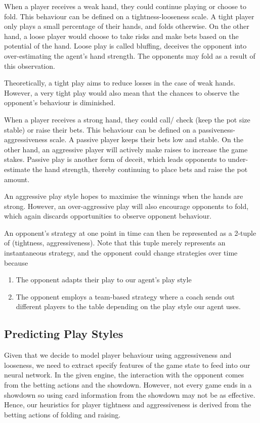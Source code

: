 \documentclass{article}
\begin{document}
When a player receives a weak hand, they could continue playing or choose to fold. This behaviour can be defined on a tightness-looseness scale. A tight player only plays a small percentage of their hands, and folds otherwise. On the other hand, a loose player would choose to take risks and make bets based on the potential of the hand. Loose play is called bluffing, deceives the opponent into over-estimating the agent's hand strength. The opponents may fold as a result of this observation.

Theoretically, a tight play aims to reduce losses in the case of weak hands. However, a very tight play would also mean that the chances to observe the opponent's behaviour is diminished.

When a player receives a strong hand, they could call/ check (keep the pot size stable) or raise their bets. This behaviour can be defined on a passiveness-aggressiveness scale. A passive player keeps their bets low and stable. On the other hand, an aggressive player will actively make raises to increase the game stakes. Passive play is another form of deceit, which leads opponents to under-estimate the hand strength, thereby continuing to place bets and raise the pot amount.

An aggressive play style hopes to maximise the winnings when the hands are strong. However, an over-aggressive play will also encourage opponents to fold, which again discards opportunities to observe opponent behaviour.

An opponent's strategy at one point in time can then be represented as a 2-tuple of (tightness, aggressiveness). Note that this tuple merely represents an instantaneous strategy, and the opponent could change strategies over time because

\begin{enumerate}
	\item The opponent adapts their play to our agent's play style
	\item The opponent employs a team-based strategy where a coach sends out different players to the table depending on the play style our agent uses.
\end{enumerate}

\subsection{Predicting Play Styles}
Given that we decide to model player behaviour using aggressiveness and looseness, we need to extract specify features of the game state to feed into our neural network. In the given engine, the interaction with the opponent comes from the betting actions and the showdown. However, not every game ends in a showdown so using card information from the showdown may not be as effective. Hence, our heuristics for player tightness and aggressiveness is derived from the betting actions of folding and raising.
\end{document}
